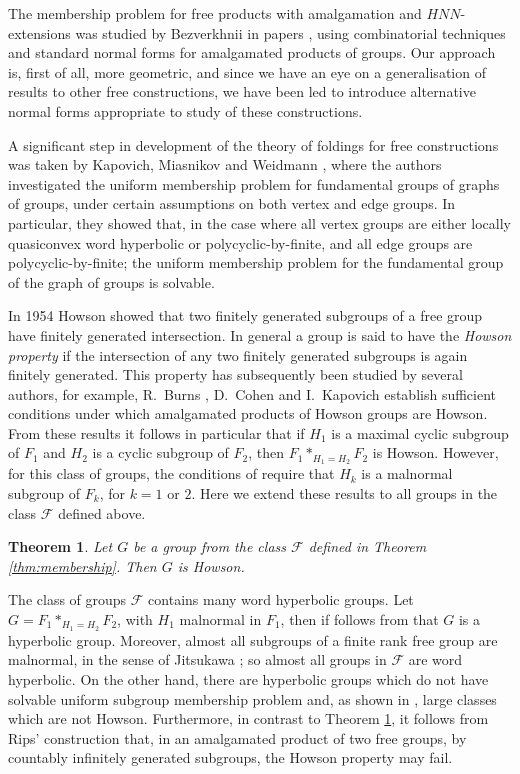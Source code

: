 \documentclass[a4paper,12pt]{article}
\newcommand{\cF}{{\cal{F}}}
\newtheorem{theorem}{Theorem}[section]
\numberwithin{equation}{section}
\numberwithin{figure}{section}
\renewcommand{\cF}{\mathcal{F}}
\begin{document}
The membership problem for free products with amalgamation and
$HNN$-extensions was studied by Bezverkhnii in papers
\cite{bez81,bez86,bez90,bez91}, using  combinatorial
techniques and standard normal forms for  amalgamated products of
groups. Our approach is, first of all, more geometric, and since
we have an eye on a generalisation of results to other free
constructions, we have been led to introduce alternative normal forms
 appropriate to
study of these constructions.

A significant step in development of the theory of foldings for
free constructions
 was taken by Kapovich, Miasnikov and Weidmann
\cite{KMW03}, where the authors investigated the uniform membership
problem for fundamental groups of graphs of groups, under certain
assumptions on both vertex and edge groups. In particular, they
showed that, in the case where all vertex groups are either locally
quasiconvex word hyperbolic or polycyclic-by-finite, and all edge
groups are polycyclic-by-finite; the uniform membership problem for the
fundamental group of the graph of groups is solvable. 


In 1954 Howson \cite{Howson54} showed that two finitely generated subgroups
of a free group have finitely generated intersection. In general a
 group is said to have the \emph{Howson property} if the intersection
of any two finitely generated subgroups is again finitely generated. 
 This property has subsequently been studied by several authors, for example,
  R.~Burns \cite{burns72}, D.~Cohen  \cite{cohen76} and I.~Kapovich \cite{kapovich97}
establish sufficient conditions under which amalgamated products of 
Howson groups are Howson. From these results it follows in particular that
if $H_1$ is a maximal cyclic subgroup of $F_1$ and $H_2$ is a cyclic
subgroup of $F_2$, then $F_1*_{H_1=H_2}F_2$ is Howson. 
However, for this class of groups, the conditions of \cite{burns72,cohen76} require that
$H_k$ is a malnormal subgroup of $F_k$, for $k=1$ or $2$. 
Here we 
extend these results to all groups in the class $\cF$ defined above.  
\begin{theorem}\label{thm:howson}
Let $G$ be a group from the class $\cF$ defined in Theorem \ref{thm:membership}.
Then $G$ is Howson. 
\end{theorem}


The class of groups $\cF$ contains many word hyperbolic groups. 
Let 
$G=F_1*_{H_1=H_2}F_2$, with $H_1$  
 malnormal 
in $F_1$, then if follows from \cite[Theorem 2]{KharlampovichMyasnikov98} that  $G$ is a hyperbolic group. 
Moreover, 
almost all subgroups of a finite rank free group are malnormal, 
in the sense of Jitsukawa \cite{Jitsukawa02}; so almost all groups in 
$\cF$ are word hyperbolic. 
On the other hand, there are 
hyperbolic groups which do not have 
solvable uniform subgroup membership problem
\cite{Rips} and, as  shown in \cite{kapovich97}, large classes which are not  Howson.
Furthermore, in contrast to Theorem \ref{thm:howson},  it follows from Rips' construction \cite{Rips} that, in an amalgamated product
of two free groups, by countably infinitely generated subgroups, the 
Howson property may fail.   
  
\end{document}
